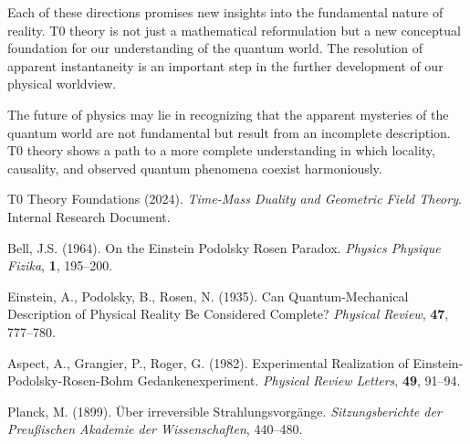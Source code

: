 \documentclass[12pt,a4paper]{article}
\begin{document}
	Each of these directions promises new insights into the fundamental nature of reality. T0 theory is not just a mathematical reformulation but a new conceptual foundation for our understanding of the quantum world. The resolution of apparent instantaneity is an important step in the further development of our physical worldview.
	
	The future of physics may lie in recognizing that the apparent mysteries of the quantum world are not fundamental but result from an incomplete description. T0 theory shows a path to a more complete understanding in which locality, causality, and observed quantum phenomena coexist harmoniously.
	
	\begin{thebibliography}{99}
		T0 Theory Foundations (2024). \textit{Time-Mass Duality and Geometric Field Theory}. Internal Research Document.
		
		Bell, J.S. (1964). On the Einstein Podolsky Rosen Paradox. \textit{Physics Physique Fizika}, \textbf{1}, 195--200.
		
		Einstein, A., Podolsky, B., Rosen, N. (1935). Can Quantum-Mechanical Description of Physical Reality Be Considered Complete? \textit{Physical Review}, \textbf{47}, 777--780.
		
		Aspect, A., Grangier, P., Roger, G. (1982). Experimental Realization of Einstein-Podolsky-Rosen-Bohm Gedankenexperiment. \textit{Physical Review Letters}, \textbf{49}, 91--94.
		
		Planck, M. (1899). Über irreversible Strahlungsvorgänge. \textit{Sitzungsberichte der Preußischen Akademie der Wissenschaften}, 440--480.
	\end{thebibliography}
	
\end{document}
